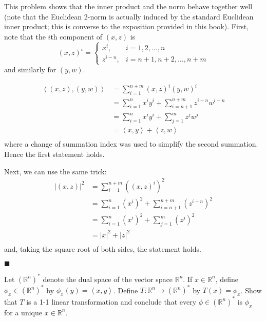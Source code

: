 \documentclass[12pt]{article}
\renewcommand{\qed}{\hfill$\blacksquare$}
\renewenvironment{proof}{\begin{addmargin}[1em]{0em}\begin{newproof}}{\end{newproof}\end{addmargin}\qed}
\newenvironment{problem}[2][Problem]{\begin{trivlist}
\item[\hskip \labelsep {\bfseries #1}\hskip \labelsep {\bfseries #2.}]}{\end{trivlist}}
\begin{document}
\begin{proof}
This problem shows that the inner product and the norm behave together well (note that the Euclidean 2-norm is actually induced by the standard Euclidean inner product; this is converse to the exposition provided in this book). First, note that the $i$th component of $\left(x,z\right)$ is
\begin{equation*}
\left(x,z\right)^i = \left\{ \begin{array}{lr}
x^i, & i=1,2,\ldots,n \\
z^{i-n}, & i = n+1,n+2,\ldots,n+m
\end{array} \right.
\end{equation*}
and similarly for $\left(y,w\right)$.

\begin{equation*}
\begin{split}
\left\langle \left(x,z\right),\left(y,w\right) \right\rangle & = \sum_{i=1}^{n+m} \left(x,z\right)^i \left(y,w\right)^i \\
& = \sum_{i=1}^n x^i y^i + \sum_{i=n+1}^{n+m} z^{i-n} w^{i-n} \\
& = \sum_{i=1}^n x^i y^i + \sum_{j=1}^m z^j w^j \\
& = \left\langle x, y\right\rangle + \left\langle z,w\right\rangle \\
\end{split}
\end{equation*}
where a change of summation index was used to simplify the second summation. Hence the first statement holds.

Next, we can use the same trick:
\begin{equation*}
\begin{split}
\left| \left(x,z\right)\right|^2 & = \sum_{i=1}^{n+m} \left(\left(x,z\right)^i\right)^2 \\
& = \sum_{i=1}^n \left(x^i\right)^2 + \sum_{i=n+1}^{n+m} \left(z^{i-n}\right)^2 \\
& = \sum_{i=1}^n \left(x^i\right)^2 + \sum_{j=1}^m \left(z^j\right)^2 \\
& = \left|x\right|^2 + \left|z\right|^2 \\
\end{split}
\end{equation*}
and, taking the square root of both sides, the statement holds.
\end{proof}
 
 
 
 \begin{problem}{1-12} Let $\left(\mathbb{R}^n\right)^*$ denote the dual space of the vector space $\mathbb{R}^n$. If $x\in\mathbb{R}^n$, define $\phi_x \in \left(\mathbb{R}^n\right)^*$ by $\phi_x \left(y\right) = \left\langle x, y\right\rangle$. Define $T:\mathbb{R}^n \rightarrow \left(\mathbb{R}^n\right)^*$ by $T\left(x\right) = \phi_x$. Show that $T$ is a 1-1 linear transformation and conclude that every $\phi \in \left(\mathbb{R}^n\right)^*$ is $\phi_x$ for a unique $x\in \mathbb{R}^n$.
\end{problem}
 
\end{document}
